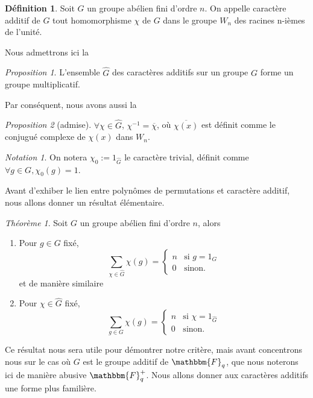 \documentclass[12pt]{article}
\theoremstyle{remark}\newtheorem{note}{Note}
\theoremstyle{remark}\newtheorem{nota}{Notation}
\newcommand{\Fq}{\mathbbm{F}_q}
\newtheorem{theorem}{Théorème}
\newtheorem{prop}{Proposition}
\theoremstyle{definition}
\newtheorem{definition}{Définition}
\begin{document}
\begin{definition}
Soit $G$ un groupe abélien fini d'ordre $n$. On appelle caractère additif de $G$ tout homomorphisme $\chi$ de $G$ dans le groupe $W_n$ des racines n-ièmes de l'unité.
\end{definition}

Nous admettrons ici la 

\begin{prop}
L'ensemble $\hat{G}$ des caractères additifs sur un groupe $G$ forme un groupe multiplicatif.
\end{prop}

Par conséquent, nous avons aussi la 

\begin{prop}[admise]
$\forall \chi \in \hat{G}$, $\chi^{-1} = \overline{\chi}$, où $\overline{\chi(x)}$ est définit comme le conjugué complexe de $\chi(x)$ dans $W_n$.
\end{prop}

\begin{nota}
On notera $ \chi_0 := 1_{\hat{G}}$  le caractère trivial, définit comme $\forall g \in G, \chi_0(g) = 1$.
\end{nota}

Avant d'exhiber le lien entre polynômes de permutations et caractère additif, nous allons donner un résultat élémentaire.

\begin{theorem}
Soit $G$ un groupe abélien fini d'ordre $n$, alors
	\begin{enumerate}[label = \roman*)]
		\item Pour $g \in G$ fixé,   
				$$
				\displaystyle\sum_{\chi \in \hat{G}} \chi(g) = \left\{
				    \begin{array}{ll}
				        n & \mbox{si } g = 1_G \\
				        0 & \mbox{sinon.}
				    \end{array}
				\right.
				$$
et de manière similaire
		\item Pour $\chi \in \hat{G}$ fixé,
				$$
				\displaystyle\sum_{g \in G} \chi(g) = \left\{
				    \begin{array}{ll}
				        n & \mbox{si } \chi = 1_{\hat{G}} \\
				        0 & \mbox{sinon.}
				    \end{array}
				\right.
				$$						
	\end{enumerate}
\end{theorem}

Ce résultat nous sera utile pour démontrer notre critère, mais avant concentrons nous sur le cas où $G$ est le groupe additif de $\Fq$, que nous noterons ici de manière abusive $\Fq^{+}$. Nous allons donner aux caractères additifs une forme plus familière.
\end{document}
